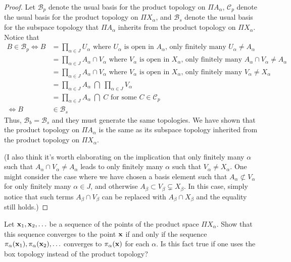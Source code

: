 \documentclass[11pt]{article}
\begin{document}
\begin{proof}
  Let $\mathcal{B}_p$ denote the usual basis for the product topology on $\Pi
  A_\alpha$, $\mathcal{C}_p$ denote the usual basis for the product topology on
  $\Pi X_\alpha$, and $\mathcal{B}_s$ denote the usual basis for the subspace
  topology that $\Pi A_\alpha$ inherits from the product topology on $\Pi X_\alpha$.
  Notice that
  \begin{align*}
    B \in \mathcal{B}_p
      \iff
        B &= \prod_{\alpha \in J} U_\alpha \text{ where
            $U_\alpha$ is open in $A_\alpha$, only finitely many $U_\alpha \neq
            A_\alpha$} \\
          &= \prod_{\alpha \in J} A_\alpha \cap V_\alpha \text{ where
          $V_\alpha$ is open in $X_\alpha$, only finitely many $A_\alpha \cap
        V_\alpha \neq A_\alpha$} \\
          &= \prod_{\alpha \in J} A_\alpha \cap V_\alpha \text{ where
          $V_\alpha$ is open in $X_\alpha$, only finitely many $V_\alpha \neq X_\alpha$} \\
          &= \prod_{\alpha \in J} A_\alpha \;\bigcap \;\prod_{\alpha
                \in J} V_\alpha \\
          &= \prod_{\alpha \in J} A_\alpha \; \bigcap \;C \text{ for some $C \in
                \mathcal{C}_p$} \\
        \iff B &\in \mathcal{B}_s
  \end{align*}
  Thus, $\mathcal{B}_b = \mathcal{B}_s$ and they must generate the same
  topologies. We have shown that the product topology on $\Pi A_\alpha$
  is the same as its subspace topology inherited from the product topology on $\Pi
  X_\alpha$.

  (I also think it's worth elaborating on the implication that only finitely many
  $\alpha$ such that $A_\alpha \cap V_\alpha \neq A_\alpha$ leads to only
  finitely many $\alpha$ such that $V_\alpha \neq X_\alpha$. One might consider
  the case where we have chosen a basis element such that $A_\alpha \not\subset
  V_\alpha$for only finitely many
  $\alpha \in J$, and otherwise $A_\beta \subset V_\beta \subsetneq X_\beta$.
  In this case, simply notice that such terms $A_\beta \cap V_\beta$ can be
  replaced with $A_\beta \cap X_\beta$ and the equality still holds.)
\end{proof}

\begin{ex}{19.6}
  Let $\vb x_1, \vb x_2, \ldots$ be a sequence of the points of the product
  space $\Pi X_\alpha$. Show that this sequence converges to the point $\vb x$
  if and only if the sequence $\pi_\alpha(\vb x_1), \pi_\alpha(\vb x_2), \ldots$
  converges to $\pi_\alpha(\vb x)$ for each $\alpha$. Is this fact true if one
  uses the box topology instead of the product topology?
\end{ex}
\end{document}
